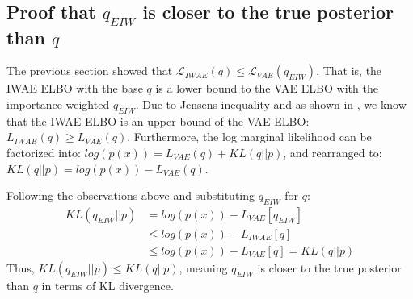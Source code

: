 \documentclass{article} %
\begin{document}



\subsection{Proof that \texorpdfstring{$q_{EIW}$}{} is closer to the true posterior than \texorpdfstring{$q$}{}}

The previous section showed that $\mathcal{L}_{IWAE}(q) \leq \mathcal{L}_{VAE}(q_{EIW})$. That is, the IWAE ELBO with the base $q$ is a lower bound to the VAE ELBO with the importance weighted $q_{EIW}$. Due to Jensen\textquotesingle s inequality and as shown in \cite{burda2015importance}, we know that the IWAE ELBO is an upper bound of the VAE ELBO: ${L}_{IWAE}(q) \geq {L}_{VAE}(q)$. Furthermore, the log marginal likelihood can be factorized into: $log(p(x)) = {L}_{VAE}(q) + KL(q||p)$, and rearranged to: $KL(q||p) = log(p(x)) - {L}_{VAE}(q)$.

Following the observations above and substituting $q_{EIW}$ for $q$:
\begin{align} 
    KL(q_{EIW}||p) &= log(p(x)) - {L}_{VAE}[q_{EIW}] \\
    &\leq log(p(x)) - {L}_{IWAE}[q] \\
    &\leq log(p(x)) - {L}_{VAE}[q] = KL(q||p)
\end{align}
Thus, $KL(q_{EIW}||p) \leq KL(q||p)$, meaning $q_{EIW}$ is closer to the true posterior than $q$ in terms of KL divergence. 
\end{document}
